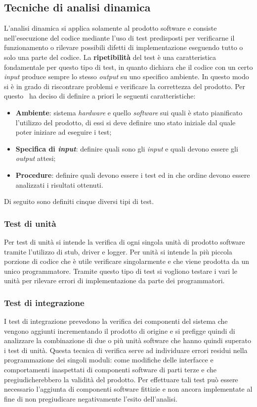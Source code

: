 \subsection{Tecniche di analisi dinamica}
L'analisi dinamica si applica solamente al prodotto software e consiste nell'esecuzione del codice mediante l'uso di test predisposti per verificarne il funzionamento o rilevare possibili difetti di implementazione eseguendo tutto o solo una parte del codice.
La \textbf{ripetibilità} del test è una caratteristica fondamentale per questo tipo di test, in quanto dichiara che il codice con un certo \textit{input} produce sempre lo stesso \textit{output} su uno specifico ambiente. In questo modo si è in grado di riscontrare problemi e verificare la correttezza del prodotto.
Per questo \gruppo ~ha deciso di definire a priori le seguenti caratteristiche:
\begin{itemize}
\item \textbf{Ambiente}: sistema \textit{hardware} e quello \textit{software} sui quali è stato pianificato l'utilizzo del prodotto, di essi si deve definire uno stato iniziale dal quale poter iniziare ad eseguire i test;
\item \textbf{Specifica di \textit{input}}: definire quali sono gli \textit{input} e quali devono essere gli \textit{output} attesi;
\item \textbf{Procedure}: definire quali devono essere i test ed in che ordine devono essere analizzati i risultati ottenuti.
\end{itemize}
Di seguito sono definiti cinque diversi tipi di test.
\subsubsection{Test di unità} 
Per test di unità si intende la verifica di ogni singola unità di prodotto software tramite l'utilizzo di stub, driver e logger. Per unità si intende la più piccola porzione di codice che è utile verificare singolarmente e che viene prodotta da un unico programmatore. Tramite questo tipo di test si vogliono testare i vari le unità per rilevare errori di implementazione da parte dei programmatori.
\subsubsection{Test di integrazione}
I test di integrazione prevedono la verifica dei componenti del sistema che vengono aggiunti incrementando il prodotto di origine e si prefigge quindi di analizzare la combinazione di due o più unità software che hanno quindi superato i test di unità. Questa tecnica di verifica serve ad individuare errori residui nella programmazione dei singoli moduli: come modifiche delle interfacce e comportamenti inaspettati di componenti software di parti terze e che pregiudicherebbero la validità del prodotto. Per effettuare tali test può essere necessario l'aggiunta di componenti software fittizie e non ancora implementate al fine di non pregiudicare negativamente l'esito dell'analisi.
